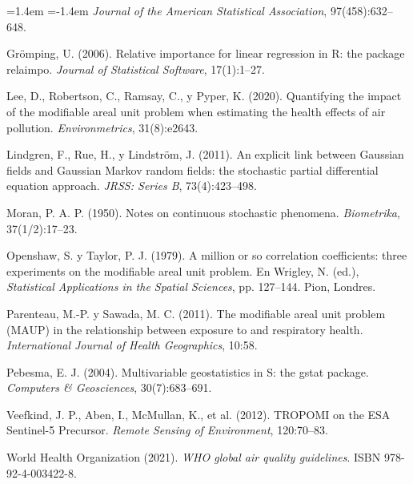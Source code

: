 \documentclass[11pt,a4paper]{article}
\begin{document}
\begin{small}
\begin{list}{}{\leftmargin=1.4em \itemindent=-1.4em \itemsep=2pt}
\emph{Journal of the American Statistical Association}, 97(458):632--648.
\item Grömping, U. (2006). Relative importance for linear regression in R: the
package relaimpo. \emph{Journal of Statistical Software}, 17(1):1--27.
\item Lee, D., Robertson, C., Ramsay, C., y Pyper, K. (2020). Quantifying the
impact of the modifiable areal unit problem when estimating the health effects
of air pollution. \emph{Environmetrics}, 31(8):e2643.
\item Lindgren, F., Rue, H., y Lindström, J. (2011). An explicit link between
Gaussian fields and Gaussian Markov random fields: the stochastic partial
differential equation approach. \emph{JRSS: Series B}, 73(4):423--498.
\item Moran, P. A. P. (1950). Notes on continuous stochastic phenomena.
\emph{Biometrika}, 37(1/2):17--23.
\item Openshaw, S. y Taylor, P. J. (1979). A million or so correlation
coefficients: three experiments on the modifiable areal unit problem. En
Wrigley, N. (ed.), \emph{Statistical Applications in the Spatial Sciences},
pp. 127--144. Pion, Londres.
\item Parenteau, M.-P. y Sawada, M. C. (2011). The modifiable areal unit
problem (MAUP) in the relationship between exposure to  and respiratory
health. \emph{International Journal of Health Geographics}, 10:58.
\item Pebesma, E. J. (2004). Multivariable geostatistics in S: the gstat
package. \emph{Computers \& Geosciences}, 30(7):683--691.
\item Veefkind, J. P., Aben, I., McMullan, K., et al. (2012). TROPOMI on the
ESA Sentinel-5 Precursor. \emph{Remote Sensing of Environment}, 120:70--83.
\item World Health Organization (2021). \emph{WHO global air quality
guidelines}. ISBN 978-92-4-003422-8.
\end{list}
\end{small}
\end{document}
